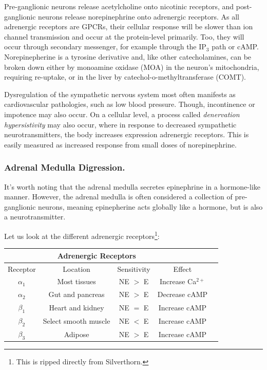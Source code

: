 Pre-ganglionic neurons release acetylcholine onto nicotinic receptors,  and post-ganglionic neurons release norepinephrine onto adrenergic receptors. As all adrenergic receptors are GPCRs, their cellular response will be slower than ion channel transmission and occur at the protein-level primarily. Too, they will occur through secondary messenger, for example through the IP$_3$ path or cAMP. Norepinepherine is a tyrosine derivative and, like other catecholamines, can be broken down either by monoamine oxidase (MOA) in the neuron's mitochondria, requiring re-uptake, or in the liver by catechol-o-methyltransferase (COMT).\newline

Dysregulation of the sympathetic nervous system most often manifests as cardiovascular pathologies, such as low blood pressure. Though, incontinence or impotence may also occur. On a cellular level, a process called \textit{denervation hypersistivity} may also occur, where in response to decreased sympathetic neurotransmitters, the body increases expression adrenergic receptors. This is easily measured as increased response from small doses of norepinephrine. 

\subsubsection{Adrenal Medulla Digression.} 
It's worth noting that the adrenal medulla secretes epinephrine in a hormone-like manner. However, the adrenal medulla is often considered a collection of pre-ganglionic neurons, meaning epinepherine acts globally like a hormone, but is also a neurotransmitter.\newline

Let us look at the different adrenergic receptors\footnote{This is ripped directly from Silverthorn.}: 

\begin{table}[!htbp]
\centering
\begin{tabular}{*5c}
\toprule
{} &  \multicolumn{2}{c}{Adrenergic Receptors} & \\
\midrule
{Receptor}   & Location & Sensitivity & Effect \\
\midrule
$\alpha_1$  &  Most tissues & NE $>$ E & Increase Ca$^{2+}$   \\
$\alpha_2$  &  Gut and pancreas & NE $>$ E & Decrease cAMP  \\
$\beta_1$   &  Heart and kidney  &  NE $=$ E & Increase cAMP   \\
$\beta_2$   &  Select smooth muscle  &  NE $<$ E & Increase cAMP   \\
$\beta_3$  &  Adipose  & NE $>$ E & Increase cAMP   \\
\bottomrule
\end{tabular}
\end{table}

